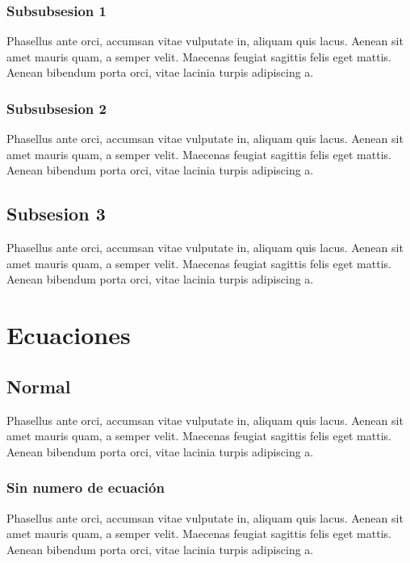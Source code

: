 \documentclass[colTwo]{NanouparIEEE}
\begin{document}
            \subsubsection{Subsubsesion 1}
                Phasellus ante orci, accumsan vitae vulputate in, aliquam quis lacus. Aenean sit amet mauris quam, a semper velit. Maecenas feugiat sagittis felis eget mattis. Aenean bibendum porta orci, vitae lacinia turpis adipiscing a. 
            
            \subsubsection{Subsubsesion 2}
                Phasellus ante orci, accumsan vitae vulputate in, aliquam quis lacus. Aenean sit amet mauris quam, a semper velit. Maecenas feugiat sagittis felis eget mattis. Aenean bibendum porta orci, vitae lacinia turpis adipiscing a. 

        \subsection{Subsesion 3}
            Phasellus ante orci, accumsan vitae vulputate in, aliquam quis lacus. Aenean sit amet mauris quam, a semper velit. Maecenas feugiat sagittis felis eget mattis. Aenean bibendum porta orci, vitae lacinia turpis adipiscing a. 

    \section{Ecuaciones}

        \subsection{Normal}
            Phasellus ante orci, accumsan vitae vulputate in, aliquam quis lacus. Aenean sit amet mauris quam, a semper velit. Maecenas feugiat sagittis felis eget mattis. Aenean bibendum porta orci, vitae lacinia turpis adipiscing a. 

            \subsubsection{Sin numero de ecuación}
                Phasellus ante orci, accumsan vitae vulputate in, aliquam quis lacus. Aenean sit amet mauris quam, a semper velit. Maecenas feugiat sagittis felis eget mattis. Aenean bibendum porta orci, vitae lacinia turpis adipiscing a. 
\end{document}
